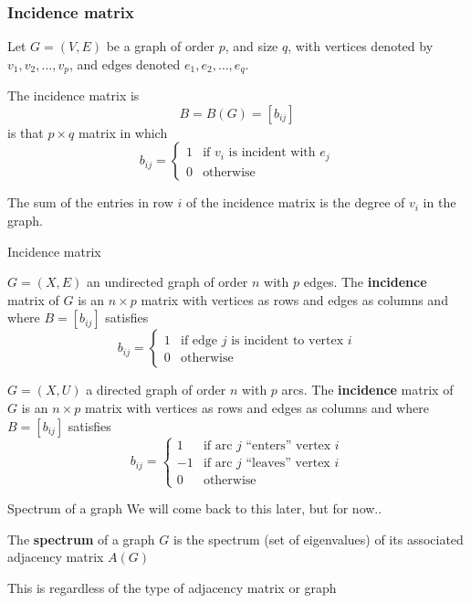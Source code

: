\documentclass[aspectratio=169]{beamer}
\begin{document}
\begin{frame}\frametitle{Incidence matrix}
	Let $G=(V,E)$ be a graph of order $p$, and size $q$, with vertices denoted by $v_1, v_2, \dots , v_p$, and edges denoted $e_1, e_2, \dots , e_q$.
	\begin{definition}
		The incidence matrix is $$B=B(G)=[b_{ij}]$$ is that $p\times q$ matrix in which
		$$b_{ij}=\left \{ 
		\begin{array}{cc}
			1 & \textrm{if } v_i \textrm{ is incident with } e_j\\
			0 & \textrm{otherwise}
		\end{array}
		\right .
		$$
	\end{definition}
	\begin{theorem}
		The sum of the entries in row $i$ of the incidence matrix is the degree of $v_i$ in the graph.
	\end{theorem}
\end{frame}

\begin{frame}{Incidence matrix}
	\begin{definition}
		$G=(X,E)$ an undirected graph of order $n$ with $p$ edges. The \textbf{incidence} matrix of $G$ is an $n\times p$ matrix with vertices as rows and edges as columns and where $B=[b_{ij}]$ satisfies
		\[
		b_{ij} = \begin{cases}
			1 & \text{if edge }j\text{ is incident to vertex }i \\
			0 & \text{otherwise}
		\end{cases}
		\]
	\end{definition}
	\vfill
	\begin{definition}
		$G=(X,U)$ a directed graph of order $n$ with $p$ arcs. The \textbf{incidence} matrix of $G$ is an $n\times p$ matrix with vertices as rows and edges as columns and where $B=[b_{ij}]$ satisfies
		\[
		b_{ij} = \begin{cases}
			1 & \text{if arc }j\text{ ``enters'' vertex }i \\
			-1 & \text{if arc }j\text{ ``leaves'' vertex }i \\
			0 & \text{otherwise}
		\end{cases}
		\]
	\end{definition}
\end{frame}




\begin{frame}{Spectrum of a graph}
	We will come back to this later, but for now..
	\vfill
	\begin{definition}
		The \textbf{spectrum} of a graph $G$ is the spectrum (set of eigenvalues) of its associated adjacency matrix $A(G)$
	\end{definition}
	\vfill
	This is regardless of the type of adjacency matrix or graph
\end{frame}
\end{document}
